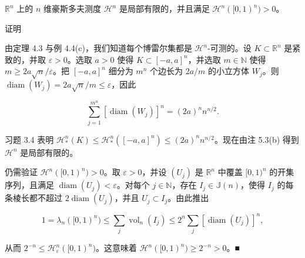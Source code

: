 \begin{lemma}

$ \mathbb{R}^n $ 上的 $ n $ 维豪斯多夫测度 $ \mathcal{H}^n $ 是局部有限的，并且满足 $ \mathcal{H}^n([0, 1)^n) > 0 $。

证明

\begin{subitems}
\item

由定理 4.3 与例 4.4(c)，我们知道每个博雷尔集都是 $ \mathcal{H}^n $-可测的。设 $ K \subset \mathbb{R}^n $ 是紧致的，并取 $ \varepsilon > 0 $。选取 $ a > 0 $ 使得 $ K \subset [-a, a]^n $，并选取 $ m \in \mathbb{N} $ 使得 $ m \ge 2a\sqrt{n}/\varepsilon $。把 $ [-a, a]^n $ 细分为 $ m^n $ 个边长为 $ 2a/m $ 的小立方体 $ W_j $。则 $ \operatorname{diam}(W_j) = 2a\sqrt{n}/m \le \varepsilon $，因此

\[
\sum_{j=1}^{m^n} \left[ \operatorname{diam}(W_j) \right]^n = (2a)^n n^{n/2} .
\]

习题 3.4 表明 $ \mathcal{H}^n_*(K) \le \mathcal{H}^n_*([-a, a]^n) \le (2a)^n n^{n/2} $。现在由注 5.3(b) 得到 $ \mathcal{H}^n $ 是局部有限的。

\item

仍需验证 $ \mathcal{H}^n([0, 1)^n) > 0 $。取 $ \varepsilon > 0 $，并设 $ (U_j) $ 是 $ \mathbb{R}^n $ 中覆盖 $ [0, 1)^n $ 的开集序列，且满足 $ \operatorname{diam}(U_j) < \varepsilon $。对每个 $ j \in \mathbb{N} $，存在 $ I_j \in \mathbb{J}(n) $，使得 $ I_j $ 的每条棱长都不超过 $ 2\operatorname{diam}(U_j) $，并且 $ U_j \subset I_j $。由此推出

\[
1 = \lambda_n([0, 1)^n) \le \sum_j \operatorname{vol}_n(I_j) \le 2^n \sum_j \left[ \operatorname{diam}(U_j) \right]^n ,
\]

从而 $ 2^{-n} \le \mathcal{H}^n_\varepsilon([0, 1)^n) $。这意味着 $ \mathcal{H}^n([0, 1)^n) \ge 2^{-n} > 0 $。\nobreak\hspace{0.35em}■

\end{subitems}

\end{lemma}

